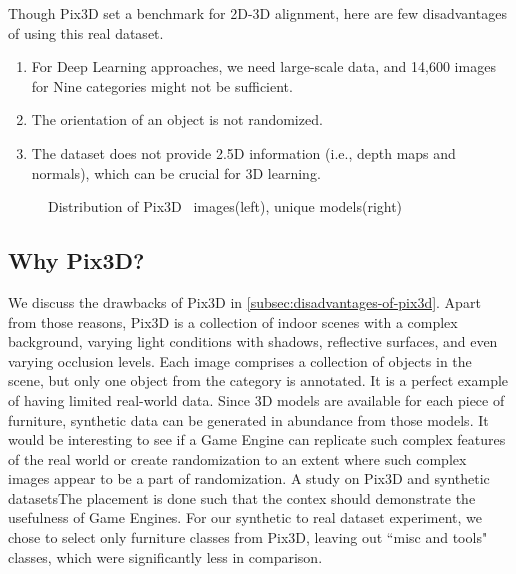 Though Pix3D set a benchmark for 2D-3D alignment, here are few disadvantages of using this real dataset.
\begin{enumerate}
    \item For Deep Learning approaches, we need large-scale data, and 14,600 images for Nine categories might not be sufficient.
    \item The orientation of an object is not randomized.
    \item The dataset does not provide 2.5D information (i.e., depth maps and normals), which can be crucial for 3D learning.
\end{enumerate}

\begin{figure}[!ht]
    \resizebox{0.49\textwidth}{6cm}{}
    \resizebox{0.49\textwidth}{6cm}{}
    \caption[Distribution of Pix3D.]{Distribution of Pix3D~\cite{Sun2018} images(left), unique models(right)}
    \label{fig:pix3d_histogram}
\end{figure}

\subsection{Why Pix3D?}\label{subsec:why-pix3d?}
We discuss the drawbacks of Pix3D in \autoref{subsec:disadvantages-of-pix3d}.
Apart from those reasons, Pix3D is a collection of indoor scenes with a complex background, varying light conditions with shadows, reflective surfaces, and even varying occlusion levels.
Each image comprises a collection of objects in the scene, but only one object from the category is annotated.
It is a perfect example of having limited real-world data.
Since 3D models are available for each piece of furniture, synthetic data can be generated in abundance from those models.
It would be interesting to see if a Game Engine can replicate such complex features of the real world or create randomization to an extent where such complex images appear to be a part of randomization.
A study on Pix3D and synthetic datasetsThe placement is done such that the contex should demonstrate the usefulness of Game Engines.
For our synthetic to real dataset experiment, we chose to select only furniture classes from Pix3D, leaving out ``misc and tools" classes, which were significantly less in comparison.

